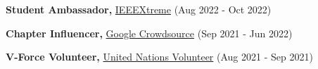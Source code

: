 \begin{cvlistsection}
\item \textbf{Student Ambassador,} \href{https://ieeextreme.org/}{IEEEXtreme} (Aug 2022 - Oct 2022)
\item \textbf{Chapter Influencer,} \href{https://crowdsource.google.com/about/}{Google Crowdsource} (Sep 2021 - Jun 2022)
\item \textbf{V-Force Volunteer,} \href{https://www.unv.org/}{United Nations Volunteer} (Aug 2021 - Sep 2021)
\end{cvlistsection}
